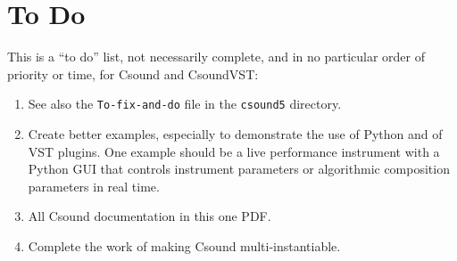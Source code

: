 \documentclass[10pt,letterpaper,onecolumn]{ltxguide}
\begin{document}
\section{To Do}

This is a ``to do'' list, not necessarily complete, and in no particular order of priority or time, for Csound and CsoundVST:

\begin{enumerate}
\item See also the \texttt{To-fix-and-do} file in the \texttt{csound5} directory.
\item Create better examples, especially to demonstrate the use of Python and of VST plugins. One example should be a live performance instrument with a Python GUI that controls instrument parameters or algorithmic composition parameters in real time.
\item All Csound documentation in this one PDF.
\item Complete the work of making Csound multi-instantiable.
\end{enumerate}
\end{document}
